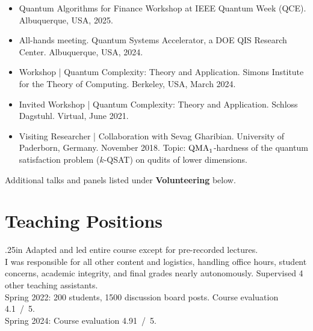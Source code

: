 \documentclass[11pt,letterpaper,serif]{moderncv}
\begin{document}
\begin{itemize}
	\item[\textbullet] Quantum Algorithms for Finance Workshop at IEEE Quantum Week (QCE). Albuquerque, USA, 2025.

	\item[\textbullet] All-hands meeting. Quantum Systems Accelerator, a DOE QIS Research Center. Albuquerque, USA, 2024.

	\item[\textbullet] Workshop | Quantum Complexity: Theory and Application. Simons Institute for the Theory of Computing. Berkeley, USA, March 2024.

	\item[\textbullet] Invited Workshop | Quantum Complexity: Theory and Application. Schloss Dagstuhl. Virtual, June 2021.

	\item[\textbullet] Visiting Researcher | Collaboration with Sevag Gharibian. University of Paderborn, Germany. November 2018.\newline
	Topic: $\textup{QMA}_{1}$-hardness of the quantum satisfaction problem ($k$-QSAT) on qudits of lower dimensions.
\end{itemize}


\smallskip
Additional talks and panels listed under \textbf{Volunteering} below.

\section{Teaching Positions}

{
	\begin{adjustwidth}{.25in}{}
		Adapted and led entire course except for pre-recorded lectures.\\
		I was responsible for all other content and logistics, handling office hours, student concerns, academic integrity, and final grades nearly autonomously.
		Supervised 4 other teaching assistants.\\
		Spring 2022: 200 students, 1500 discussion board posts. Course evaluation 4.1~/~5.
		\\ Spring 2024: Course evaluation 4.91~/~5.
	\end{adjustwidth}
}
\end{document}
